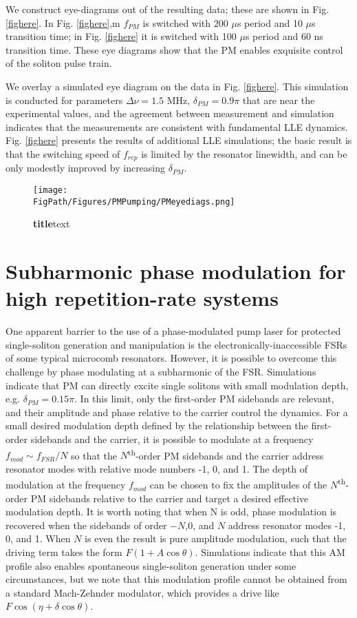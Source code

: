 We construct eye-diagrams out of the resulting data; these are shown in Fig. \ref{fighere}. In Fig. \ref{fighere},m $f_{PM}$ is switched with 200 $\mu$s period and 10 $\mu$s transition time; in Fig. \ref{fighere} it is switched with 100 $\mu$s period and 60 ns transition time. These eye diagrams show that the PM enables exquisite control of the soliton pulse train.

We overlay a simulated eye diagram on the data in Fig. \ref{fighere}. This simulation is conducted for parameters $\Delta\nu=1.5$ MHz, $\delta_{PM}=0.9\pi$ that are near the experimental values, and the agreement between measurement and simulation indicates that the measurements are consistent with fundamental LLE dynamics. Fig. \ref{fighere} presents the results of additional LLE simulations; the basic result is that the switching speed of $f_{rep}$ is limited by the resonator linewidth, and can be only modestly improved by increasing $\delta_{PM}$. 

\begin{figure}[htpb]
	\begin{center}
		\texttt{[image: \\FigPath/Figures/PMPumping/PMeyediags.png]}
	\end{center}
	\caption[Figure Title]{\textbf{title}text}
	\label{fig:PMeyediags}
\end{figure} 

\section{Subharmonic phase modulation for high repetition-rate systems}

One apparent barrier to the use of a phase-modulated pump laser for protected single-soliton generation and manipulation is the electronically-inaccessible FSRs of some typical microcomb resonators. However, it is possible to overcome this challenge by phase modulating at a subharmonic of the FSR.  Simulations indicate that PM can directly excite single solitons with small modulation depth, e.g. $\delta_{PM}=0.15\pi$. In this limit, only the first-order PM sidebands are relevant, and their amplitude and phase relative to the carrier control the dynamics. For a small desired modulation depth defined by the relationship between the first-order sidebands and the carrier, it is possible to modulate at a frequency $f_{mod}\sim f_{FSR}/N$ so that the $N$\textsuperscript{th}-order PM sidebands and the carrier address resonator modes with relative mode numbers -1, 0, and 1. The depth of modulation at the frequency $f_{mod}$ can be chosen to fix the amplitudes of the $N$\textsuperscript{th}-order PM sidebands relative to the carrier and target a desired effective modulation depth. It is worth noting that when N is odd, phase modulation is recovered when the sidebands of order $-N$,0, and $N$ address resonator modes -1, 0, and 1. When $N$ is even the result is pure amplitude modulation, such that the driving term takes the form $F(1+A \cos{\theta})$. Simulations indicate that this AM profile also enables spontaneous single-soliton generation under some circumstances, but we note that this modulation profile cannot be obtained from a standard Mach-Zehnder modulator, which provides a drive like $F \cos(\eta+\delta \cos{\theta})$.


